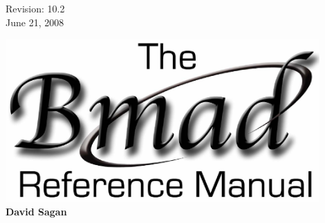 \thispagestyle{empty}

\begin{flushright}
\large
  Revision: 10.2 \\
  June 21, 2008 \\
\end{flushright}

\vfill

{
\begin{center}
\includegraphics[width=12cm]{bmad-ref-manual.eps} \\
\vskip 0.3in
\huge\bf David Sagan
\end{center}
}

\vfill
\break

